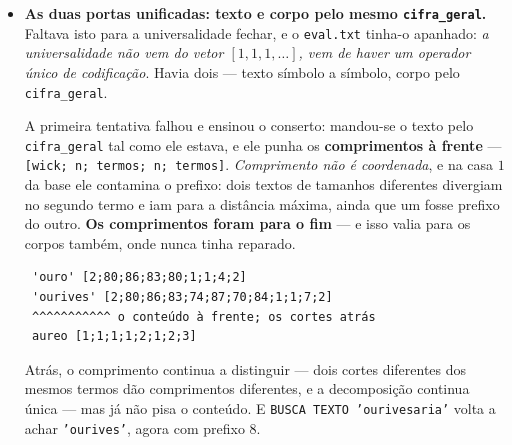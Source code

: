 \documentclass[11pt]{article}
\newcommand{\code}[1]{\texttt{\small #1}}
\theoremstyle{plain}
\theoremstyle{remark}
\begin{document}
\begin{itemize}
\begin{verbatim}
 logico [1; 2; 1,1; 3; 1,2,1]
 ^ ^ ^^^ ^ ^^^^^
 | | | | o lado DUAL — a META-INDUÇÃO, que contrai
 | | a INDUÇÃO: base + passo, sempre o mesmo passo
 | dois termos do lado próprio
 Wick: é o lado próprio que carrega o real
\end{verbatim}

\textbf{E a meta-indução já lá estava}, sem se acrescentar nada: o \code{cifra\_geral} escreve as
duas metades. O lado próprio é $\mathrm{lado}(1,-1)$, a indução que estica; o lado dual é
$\mathrm{lado}(1,+1)$, \emph{o mesmo passo com o sinal trocado} --- a contração. A indução anda
para cima e nunca fecha sozinha (precisa da base); a meta-indução contrai --- indução sobre
induções, o passo aplicado ao próprio passo. $\sigma$ e $-1/\sigma$, produto $-1$: \emph{uma
estica exatamente o que a outra contrai.}

E o \code{logico} cai no mesmo lugar do \code{aureo}, como tinha de cair.

\item \textbf{As duas portas unificadas: texto e corpo pelo mesmo \code{cifra\_geral}.} Faltava
isto para a universalidade fechar, e o \code{eval.txt} tinha-o apanhado: \emph{a universalidade não
vem do vetor $[1,1,1,\dots]$, vem de haver um operador único de codificação}. Havia dois --- texto
símbolo a símbolo, corpo pelo \code{cifra\_geral}.

A primeira tentativa falhou e ensinou o conserto: mandou-se o texto pelo \code{cifra\_geral} tal
como ele estava, e ele punha os \textbf{comprimentos à frente} --- \code{[wick; n; termos; n;
termos]}. \emph{Comprimento não é coordenada}, e na casa $1$ da base ele contamina o prefixo: dois
textos de tamanhos diferentes divergiam no segundo termo e iam para a distância máxima, ainda que
um fosse prefixo do outro. \textbf{Os comprimentos foram para o fim} --- e isso valia para os
corpos também, onde nunca tinha reparado.

\begin{verbatim}
 'ouro' [2;80;86;83;80;1;1;4;2]
 'ourives' [2;80;86;83;74;87;70;84;1;1;7;2]
 ^^^^^^^^^^^ o conteúdo à frente; os cortes atrás
 aureo [1;1;1;1;2;1;2;3]
\end{verbatim}

Atrás, o comprimento continua a distinguir --- dois cortes diferentes dos mesmos termos dão
comprimentos diferentes, e a decomposição continua única --- mas já não pisa o conteúdo. E
\code{BUSCA TEXTO 'ourivesaria'} volta a achar \code{'ourives'}, agora com prefixo $8$.


\end{itemize}
\end{document}
